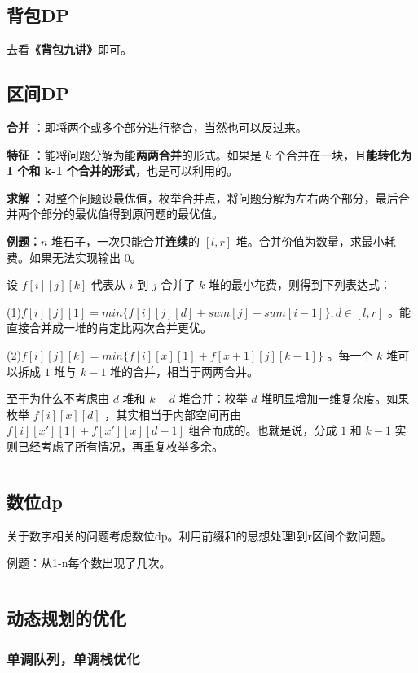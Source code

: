 \documentclass[a4paper,11pt]{article}
\begin{document}
\subsection{背包DP}
去看\textbf{《背包九讲》}即可。
\subsection{区间DP}
\textbf{合并} ：即将两个或多个部分进行整合，当然也可以反过来。

\textbf{特征} ：能将问题分解为能\textbf{两两合并}的形式。如果是 \(k\)
个合并在一块，且\textbf{能转化为 1 个和 k-1
个合并的形式}，也是可以利用的。

\textbf{求解}
：对整个问题设最优值，枚举合并点，将问题分解为左右两个部分，最后合并两个部分的最优值得到原问题的最优值。

\textbf{例题：}\(n\) 堆石子，一次只能合并\textbf{连续}的 \([l,r]\)
堆。合并价值为数量，求最小耗费。如果无法实现输出 0。

设 \(f[i][j][k]\) 代表从 \(i\) 到 \(j\) 合并了 \(k\)
堆的最小花费，则得到下列表达式：

(1)\(f[i][j][1]=min\lbrace f[i][j][d]+sum[j]-sum[i-1] \rbrace,d\in[l,r]\)
。能直接合并成一堆的肯定比两次合并更优。

(2)\(f[i][j][k]=min\lbrace f[i][x][1]+f[x+1][j][k-1] \rbrace\) 。每一个
\(k\) 堆可以拆成 \(1\) 堆与 \(k-1\) 堆的合并，相当于两两合并。

至于为什么不考虑由 \(d\) 堆和 \(k-d\) 堆合并：枚举 \(d\)
堆明显增加一维复杂度。如果枚举 \(f[i][x][d]\) ，其实相当于内部空间再由
\(f[i][x'][1]+f[x'][x][d-1]\) 组合而成的。也就是说，分成 \(1\) 和
\(k-1\) 实则已经考虑了所有情况，再重复枚举多余。
\inputminted[linenos]{c++}{dp/rangedp.cpp}

\subsection{数位dp}
关于数字相关的问题考虑数位dp。利用前缀和的思想处理l到r区间个数问题。

例题：从1-n每个数出现了几次。
\inputminted[linenos]{cpp}{dp/shuwei.cpp}

\subsection{动态规划的优化}
\subsubsection{单调队列，单调栈优化}
\end{document}
